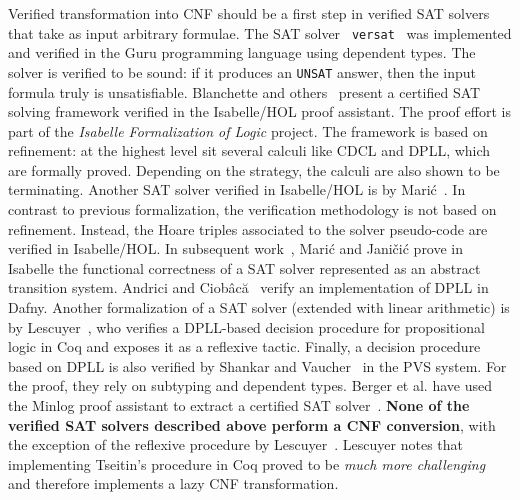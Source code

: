 Verified transformation into CNF should be a first step in verified
SAT solvers that take as input arbitrary formulae. The SAT solver {\tt
  versat}~\cite{DBLP:conf/vmcai/OeSOC12} was implemented and verified
in the Guru programming language using dependent types. The solver is
verified to be sound: if it produces an {\tt UNSAT} answer, then the
input formula truly is unsatisfiable. Blanchette and
others~\cite{DBLP:journals/jar/BlanchetteFLW18} present a certified
SAT solving framework verified in the Isabelle/HOL proof
assistant. The proof effort is part of the \emph{Isabelle
  Formalization of Logic} project. The framework is based on
refinement: at the highest level sit several calculi like CDCL and
DPLL, which are formally proved. Depending on the strategy, the
calculi are also shown to be terminating. Another SAT solver verified
in Isabelle/HOL is by Mari\'{c}~\cite{DBLP:journals/jar/Maric09}. In
contrast to previous formalization, the verification methodology is
not based on refinement. Instead, the Hoare triples associated to the
solver pseudo-code are verified in Isabelle/HOL. In subsequent
work~\cite{DBLP:journals/corr/abs-1108-4368}, Mari{\'c} and Janičić
prove in Isabelle the functional correctness of a SAT solver
represented as an abstract transition system. Andrici and
Ciobâcă~\cite{DBLP:journals/corr/abs-2007-10842,DBLP:journals/corr/abs-1909-01743}
verify an implementation of DPLL in Dafny. Another formalization of a
SAT solver (extended with linear arithmetic) is by
Lescuyer~\cite{lescuyer:tel-00713668}, who verifies a DPLL-based
decision procedure for propositional logic in Coq and exposes it as a
reflexive tactic. Finally, a decision procedure based on DPLL is also
verified by Shankar and Vaucher~\cite{DBLP:journals/entcs/ShankarV11}
in the PVS system. For the proof, they rely on subtyping and dependent
types. Berger et al. have used the Minlog proof assistant to extract a
certified SAT solver~\cite{DBLP:journals/corr/BergerLFS15}.  {\bf None
  of the verified SAT solvers described above perform a CNF
  conversion}, with the exception of the reflexive procedure by
Lescuyer~\cite{lescuyer:tel-00713668}. Lescuyer notes that
implementing Tseitin's procedure in Coq proved to be \emph{much more
  challenging} and therefore implements a lazy CNF transformation.
